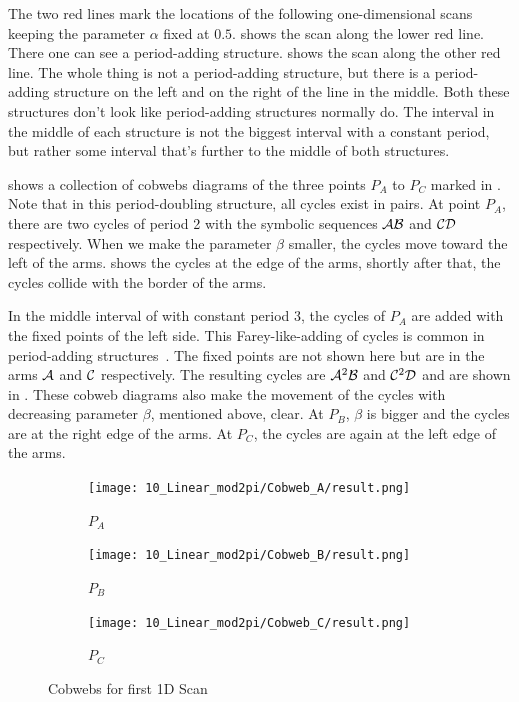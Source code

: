 The two red lines mark the locations of the following one-dimensional scans keeping the parameter $\alpha$ fixed at $0.5$.
 shows the scan along the lower red line.
There one can see a period-adding structure.
 shows the scan along the other red line.
The whole thing is not a period-adding structure, but there is a period-adding structure on the left and on the right of the line in the middle.
Both these structures don't look like period-adding structures normally do.
The interval in the middle of each structure is not the biggest interval with a constant period, but rather some interval that's further to the middle of both structures.

 shows a collection of cobwebs diagrams of the three points $P_A$ to $P_C$ marked in .
Note that in this period-doubling structure, all cycles exist in pairs.
At point $P_A$, there are two cycles of period 2 with the symbolic sequences $\mathcal{A}\mathcal{B}$ and $\mathcal{C}\mathcal{D}$ respectively.
When we make the parameter $\beta$ smaller, the cycles move toward the left of the arms.
 shows the cycles at the edge of the arms, shortly after that, the cycles collide with the border of the arms.

In the middle interval of  with constant period 3, the cycles of $P_A$ are added with the fixed points of the left side.
This Farey-like-adding of cycles is common in period-adding structures~\cite{avrutin2019continuous}.
The fixed points are not shown here but are in the arms $\mathcal{A}$ and $\mathcal{C}$ respectively.
The resulting cycles are $\mathcal{A}^2\mathcal{B}$ and $\mathcal{C}^2\mathcal{D}$ and are shown in .
These cobweb diagrams also make the movement of the cycles with decreasing parameter $\beta$, mentioned above, clear.
At $P_B$, $\beta$ is bigger and the cycles are at the right edge of the arms.
At $P_C$, the cycles are again at the left edge of the arms.

\begin{figure}
	\centering
	\begin{subfigure}{0.3\textwidth}
		\centering
		\texttt{[image: 10\_Linear\_mod2pi/Cobweb\_A/result.png]}
		\caption{$P_A$}
		\label{fig:pcw.lin.CobwebA}
	\end{subfigure}
	\begin{subfigure}{0.3\textwidth}
		\centering
		\texttt{[image: 10\_Linear\_mod2pi/Cobweb\_B/result.png]}
		\caption{$P_B$}
		\label{fig:pcw.lin.CobwebB}
	\end{subfigure}
	\begin{subfigure}{0.3\textwidth}
		\centering
		\texttt{[image: 10\_Linear\_mod2pi/Cobweb\_C/result.png]}
		\caption{$P_C$}
		\label{fig:pcw.lin.CobwebC}
	\end{subfigure}
	\caption{Cobwebs for first 1D Scan}
	\label{fig:pcw.lin.CobwebA-C}
\end{figure}

